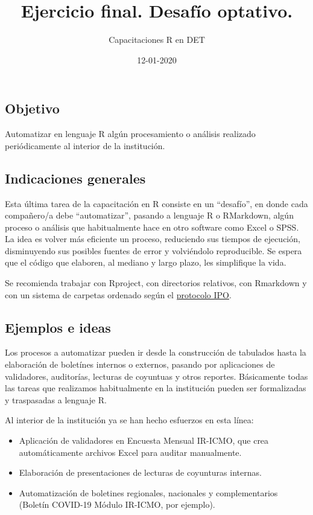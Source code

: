 \documentclass[
]{article}
\title{Ejercicio final. Desafío optativo.}
\author{Capacitaciones R en DET}
\date{12-01-2020}
\begin{document}
\maketitle

\hypertarget{objetivo}{%
\subsection{Objetivo}\label{objetivo}}

Automatizar en lenguaje R algún procesamiento o análisis realizado
periódicamente al interior de la institución.

\hypertarget{indicaciones-generales}{%
\subsection{Indicaciones generales}\label{indicaciones-generales}}

Esta última tarea de la capacitación en R consiste en un ``desafío'', en
donde cada compañero/a debe ``automatizar'', pasando a lenguaje R o
RMarkdown, algún proceso o análisis que habitualmente hace en otro
software como Excel o SPSS. La idea es volver más eficiente un proceso,
reduciendo sus tiempos de ejecución, disminuyendo sus posibles fuentes
de error y volviéndolo reproducible. Se espera que el código que
elaboren, al mediano y largo plazo, les simplifique la vida.

Se recomienda trabajar con Rproject, con directorios relativos, con
Rmarkdown y con un sistema de carpetas ordenado según el
\href{https://capacitacionesdet.github.io/sesion_2/\#9}{protocolo IPO}.

\hypertarget{ejemplos-e-ideas}{%
\subsection{Ejemplos e ideas}\label{ejemplos-e-ideas}}

Los procesos a automatizar pueden ir desde la construcción de tabulados
hasta la elaboración de boletínes internos o externos, pasando por
aplicaciones de validadores, auditorías, lecturas de coyuntuas y otros
reportes. Básicamente todas las tareas que realizamos habitualmente en
la institución pueden ser formalizadas y traspasadas a lenguaje R.

Al interior de la institución ya se han hecho esfuerzos en esta línea:

\begin{itemize}
\item
  Aplicación de validadores en Encuesta Mensual IR-ICMO, que crea
  automáticamente archivos Excel para auditar manualmente.
\item
  Elaboración de presentaciones de lecturas de coyunturas internas.
\item
  Automatización de boletines regionales, nacionales y complementarios
  (Boletín COVID-19 Módulo IR-ICMO, por ejemplo).
\end{itemize}
\end{document}
